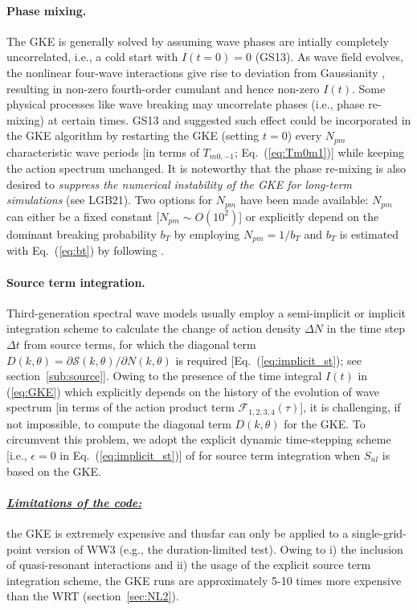 \paragraph{Phase mixing.} The GKE is generally solved by assuming wave phases
are intially completely uncorrelated, i.e., a cold start with $I(t=0) = 0$ (GS13).
As wave field evolves, the nonlinear four-wave interactions give rise to
deviation from Gaussianity \citep{Janssen2003}, resulting in non-zero
fourth-order cumulant and hence non-zero $I(t)$. Some physical processes
like wave breaking \citep[e.g.,][]{bk:Bab11} may uncorrelate phases (i.e.,
phase re-mixing) at certain times. GS13 and \citet{Gramstad2016} suggested
such effect could be incorporated in the GKE algorithm by restarting the
GKE  (setting $t=0$) every $N_{pm}$ characteristic wave periods
[in terms of $T_{m0, -1}$; Eq.~(\ref{eq:Tm0m1})] while keeping the action
spectrum unchanged. It is noteworthy that the phase re-mixing is also
desired to \emph{suppress the numerical instability of the GKE for long-term
simulations} (see LGB21). Two options for $N_{pm}$ have been made available:
$N_{pm}$ can either be a fixed constant [$N_{pm} \sim \textit{O} (10^2)$]
or explicitly depend on the dominant breaking probability $b_T$ by employing
$N_{pm} = 1 / b_T$ and $b_T$ is estimated with Eq.~(\ref{eq:bt}) by following
\citet{art:BBY01}.

\paragraph{Source term integration.} Third-generation spectral wave models
usually employ a semi-implicit or implicit integration scheme to calculate
the change of action density $\Delta N$ in the time step $\Delta t$ from
source terms, for which the diagonal term $D(k, \theta) = \partial \mathcal{S} (k, \theta) / \partial N(k, \theta)$
is required [Eq.~(\ref{eq:implicit_st}); see section~\ref{sub:source}].
Owing to the presence of the time integral $I(t)$ in (\ref{eq:GKE}) which
explicitly depends on the history of the evolution of wave spectrum
[in terms of the action product term $\mathcal{F}_{1,2,3,4} (\tau)$], it is
challenging, if not impossible, to compute the diagonal term $D(k, \theta)$
for the GKE. To circumvent this problem, we adopt the explicit dynamic
time-stepping scheme [i.e., $\epsilon = 0$ in Eq.~(\ref{eq:implicit_st})]
of \citet{tol:JPO92} for source term integration when $S_{nl}$ is based
on the GKE.

\paragraph{\textit{\underline{Limitations of the code:}}} the GKE is
extremely expensive and thusfar can only be applied to a single-grid-point
version of WW3 (e.g., the duration-limited test). Owing to i) the inclusion of
quasi-resonant interactions and ii) the usage of the explicit source term
integration scheme, the GKE runs are approximately 5-10 times more
expensive than the WRT (section~\ref{sec:NL2}).
